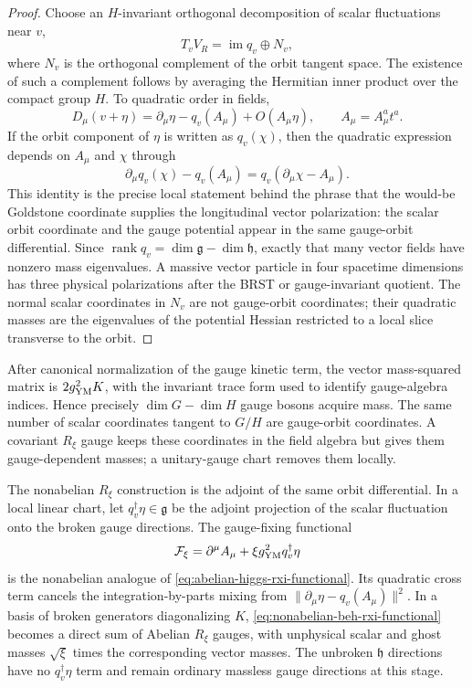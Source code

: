 \begin{proof}
Choose an \(H\)-invariant orthogonal decomposition of scalar fluctuations
near \(v\),
\[
  T_vV_R
  =
  \operatorname{im} q_v\oplus N_v,
\]
where \(N_v\) is the orthogonal complement of the orbit tangent space.  The
existence of such a complement follows by averaging the Hermitian inner
product over the compact group \(H\).  To quadratic order in fields,
\[
  D_\mu(v+\eta)
  =
  \partial_\mu\eta-q_v(A_\mu)+O(A_\mu\eta),
  \qquad A_\mu=A_\mu^a t^a .
\]
If the orbit component of \(\eta\) is written as \(q_v(\chi)\), then the
quadratic expression depends on \(A_\mu\) and \(\chi\) through
\[
  \partial_\mu q_v(\chi)-q_v(A_\mu)
  =
  q_v(\partial_\mu\chi-A_\mu).
\]
This identity is the precise local statement behind the phrase that the
would-be Goldstone coordinate supplies the longitudinal vector polarization:
the scalar orbit coordinate and the gauge potential appear in the same
gauge-orbit differential.  Since \(\operatorname{rank}q_v=\dim\mathfrak g-
\dim\mathfrak h\), exactly that many vector fields have nonzero mass
eigenvalues.  A massive vector particle in four spacetime dimensions has three
physical polarizations after the BRST or gauge-invariant quotient.  The
normal scalar coordinates in \(N_v\) are not gauge-orbit coordinates; their
quadratic masses are the eigenvalues of the potential Hessian restricted to a
local slice transverse to the orbit.
\end{proof}

After canonical normalization of the gauge kinetic term, the vector
mass-squared matrix is \(2g_{\rm YM}^2K\), with the invariant trace form used
to identify gauge-algebra indices.  Hence precisely
\(\dim G-\dim H\) gauge bosons acquire mass.  The same number of scalar
coordinates tangent to \(G/H\) are gauge-orbit coordinates.  A covariant
\(R_\xi\) gauge keeps these coordinates in the field algebra but gives them
gauge-dependent masses; a unitary-gauge chart removes them locally.

The nonabelian \(R_\xi\) construction is the adjoint of the same orbit
differential.  In a local linear chart, let \(q_v^\dagger\eta\in\mathfrak g\)
be the adjoint projection of the scalar fluctuation onto the broken gauge
directions.  The gauge-fixing functional
\begin{equation}
  \mathcal F_\xi
  =
  \partial^\mu A_\mu+\xi g_{\rm YM}^2 q_v^\dagger\eta
  \label{eq:nonabelian-beh-rxi-functional}
\end{equation}
is the nonabelian analogue of
\eqref{eq:abelian-higgs-rxi-functional}.  Its quadratic cross term cancels
the integration-by-parts mixing from
\(\|\partial_\mu\eta-q_v(A_\mu)\|^2\).  In a basis of broken generators
diagonalizing \(K\), \eqref{eq:nonabelian-beh-rxi-functional} becomes a direct
sum of Abelian \(R_\xi\) gauges, with unphysical scalar and ghost masses
\(\sqrt{\xi}\) times the corresponding vector masses.  The unbroken
\(\mathfrak h\) directions have no \(q_v^\dagger\eta\) term and remain
ordinary massless gauge directions at this stage.

